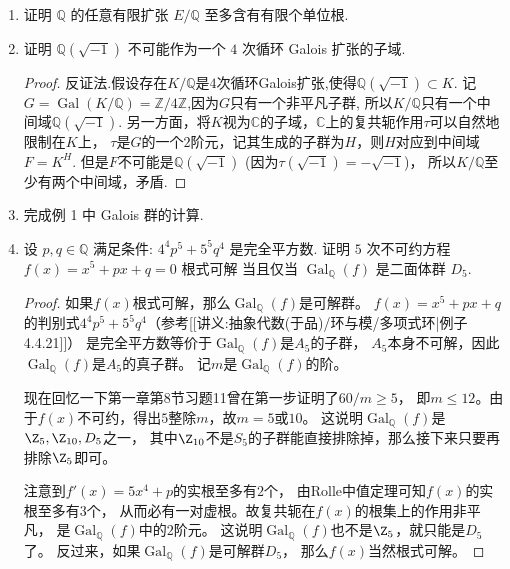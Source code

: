 \begin{enumerate}
\item 证明 $ \mathbb{Q} $ 的任意有限扩张 $ E/\mathbb{Q} $ 至多含有有限个单位根.

\item 证明 $ \mathbb{Q}(\sqrt{-1}) $ 不可能作为一个 $4$ 次循环 Galois 扩张的子域.
\begin{proof}
    反证法.假设存在$K/\mathbb{Q}$是$4$次循环Galois扩张,使得$\mathbb{Q}(\sqrt{-1})\subset K$.
    记$G=\operatorname{Gal}(K/\mathbb{Q})=\mathbb{Z}/4\mathbb{Z}$,因为$G$只有一个非平凡子群,
    所以$K/\mathbb{Q}$只有一个中间域$\mathbb{Q}(\sqrt{-1})$.
    另一方面，将$K$视为$\mathbb{C}$的子域，$\mathbb{C}$上的复共轭作用$\tau$可以自然地限制在$K$上，
    $\tau$是$G$的一个$2$阶元，记其生成的子群为$H$，则$H$对应到中间域$F=K^H$.
    但是$F$不可能是$\mathbb{Q}(\sqrt{-1})$ (因为$\tau(\sqrt{-1})=-\sqrt{-1}$)，
    所以$K/\mathbb{Q}$至少有两个中间域，矛盾.
\end{proof}

\item 完成例 1 中 Galois 群的计算.

\item 设 $ p, q \in \mathbb{Q} $ 满足条件: $ 4^4p^5 + 5^5q^4 $ 是完全平方数.
证明 $5$ 次不可约方程 $f(x) = x^5 + px + q = 0$ 根式可解
当且仅当 $ \operatorname{Gal}_\mathbb{Q}(f) $ 是二面体群 $ D_5 $.
\begin{proof}
    如果$f(x)$根式可解，那么$\operatorname{Gal}_\mathbb{Q}(f)$是可解群。
    $f(x)=x^5+px+q$的判别式$4^4p^5+5^5q^4$（参考[[讲义:抽象代数(于品)/环与模/多项式环|例子4.4.21]]）
    是完全平方数等价于$\operatorname{Gal}_\mathbb{Q}(f)$是$A_5$的子群，
    $A_5$本身不可解，因此$\operatorname{Gal}_\mathbb{Q}(f)$是$A_5$的真子群。
    记$m$是$\operatorname{Gal}_\mathbb{Q}(f)$的阶。

    现在回忆一下第一章第8节习题11曾在第一步证明了$60/m\geqslant5$，
    即$m\leqslant12$。由于$f(x)$不可约，得出$5$整除$m$，故$m=5$或$10$。
    这说明$\operatorname{Gal}_\mathbb{Q}(f)$是$\Z_5,\Z_{10},D_5$之一，
    其中$\Z_{10}$不是$S_5$的子群能直接排除掉，那么接下来只要再排除$\Z_5$即可。
    
    注意到$f'(x)=5x^4+p$的实根至多有$2$个，
    由Rolle中值定理可知$f(x)$的实根至多有$3$个，
    从而必有一对虚根。故复共轭在$f(x)$的根集上的作用非平凡，
    是$\operatorname{Gal}_\mathbb{Q}(f)$中的$2$阶元。
    这说明$\operatorname{Gal}_\mathbb{Q}(f)$也不是$\Z_5$，就只能是$D_5$了。
    反过来，如果$\operatorname{Gal}_\mathbb{Q}(f)$是可解群$D_5$，
    那么$f(x)$当然根式可解。
\end{proof}


\end{enumerate}

